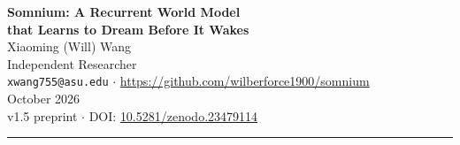 \documentclass[11pt,a4paper]{article}
\begin{document}
\begin{center}
{\LARGE\bfseries Somnium: A Recurrent World Model\\[5pt] that Learns to Dream Before It Wakes}\\[13pt]
{\large Xiaoming (Will) Wang}\\[5pt]
{\small Independent Researcher}\\[2pt]
{\small \texttt{xwang755@asu.edu} $\cdot$ \url{https://github.com/wilberforce1900/somnium}}\\[5pt]
{\small October 2026}\\[3pt]
{\small v1.5 preprint $\cdot$ DOI: \href{https://doi.org/10.5281/zenodo.23479114}{10.5281/zenodo.23479114}}
\end{center}
\vspace{2pt}
\noindent\rule{\textwidth}{0.4pt}
\vspace{2pt}
\end{document}
